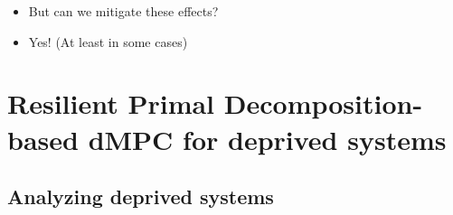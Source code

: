 \documentclass[aspectratio=169]{beamer}
\begin{document}
\begin{frame}{}
  \begin{itemize}[<+(1)->]
    \item But can we mitigate these effects?
    \item Yes! (At least in some cases)
  \end{itemize}

\end{frame}

\section{Resilient Primal Decomposition-based dMPC for deprived systems}
\subsection{Analyzing deprived systems}
\end{document}
